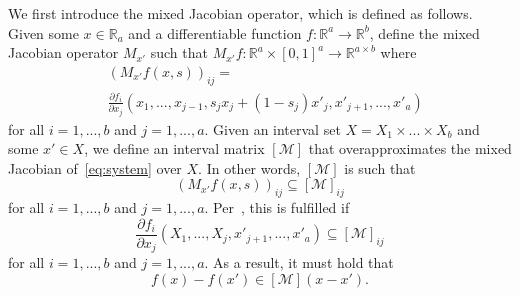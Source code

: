 \documentclass[preprint,12pt]{elsarticle}
\begin{document}
We first introduce the mixed Jacobian operator, which is defined as follows. Given some $x \in \mathbb{R}_a$ and a differentiable function $f:\mathbb{R}^a\rightarrow\mathbb{R}^b$, define the mixed Jacobian operator $M_{x'}$ such that $M_{x'}f:\mathbb{R}^a \times [0, 1]^a \rightarrow \mathbb{R}^{a\times b}$ where
\begin{align}
    &(M_{x'}f(x, s))_{ij} =  \nonumber\\
    &\frac{\partial f_i}{\partial x_j}(x_1, ..., x_{j-1}, s_jx_j + (1-s_j)x'_j, x'_{j+1}, ..., x'_a)
\end{align}
for all $i = 1, ..., b$ and $j = 1,...,a$. Given an interval set $X=X_1 \times ...\times X_b$ and some $x' \in X$, we define an interval matrix $[\mathcal{M}]$ that overapproximates the mixed Jacobian of~\eqref{eq:system} over $X$. In other words, $[\mathcal{M}]$ is such that
\begin{equation}
    (M_{x'}f(x, s))_{ij} \subseteq [\mathcal{M}]_{ij}
    \label{eq:mixed_req}
\end{equation}
for all $i = 1, ..., b$ and $j = 1,...,a$. Per~\cite[Corollary 1]{harapanahalliLDI}, this is fulfilled if
\begin{equation}
    \frac{\partial f_i}{\partial x_j}(X_1, ..., X_j, x'_{j+1}, ..., x'_a) \subseteq [\mathcal{M}]_{ij}
    \label{eq:mixed_interval}
\end{equation}
for all $i = 1, ..., b$ and $j = 1,...,a$. As a result, it must hold that
\begin{equation}
    f(x) - f(x') \in [\mathcal{M}](x - x').
\end{equation}
\end{document}
